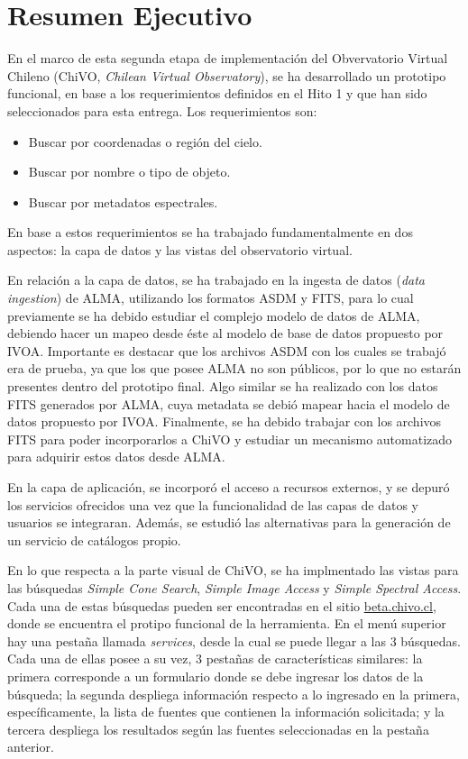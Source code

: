\section{Resumen Ejecutivo}

En el marco de esta segunda etapa de implementación del Obvervatorio
Virtual Chileno (ChiVO, \emph{Chilean Virtual Observatory}), se ha
desarrollado un prototipo funcional, en base a los requerimientos
definidos en el Hito 1 y que han sido seleccionados para esta entrega.
Los requerimientos son:

\begin{itemize}
  \item Buscar por coordenadas o región del cielo.
  \item Buscar por nombre o tipo de objeto.
  \item Buscar por metadatos espectrales.
\end{itemize}

En base a estos requerimientos se ha trabajado fundamentalmente en dos
aspectos: la capa de datos y las vistas del observatorio virtual.

En relación a la capa de datos, se ha trabajado en la ingesta de datos
(\emph{data ingestion}) de ALMA, utilizando los formatos ASDM y FITS,
para lo cual previamente se ha debido estudiar el complejo modelo de
datos de ALMA, debiendo hacer un mapeo desde éste al modelo de base de
datos propuesto por IVOA. Importante es destacar que los archivos ASDM
con los cuales se trabajó era de prueba, ya que los que posee ALMA no
son públicos, por lo que no estarán presentes dentro del prototipo
final. Algo similar se ha realizado con los datos FITS generados por
ALMA, cuya metadata se debió mapear hacia el modelo de datos propuesto
por IVOA. Finalmente, se ha debido trabajar con los archivos FITS para
poder incorporarlos a ChiVO y estudiar un mecanismo automatizado para
adquirir estos datos desde ALMA.

En la capa de aplicación, se incorporó el acceso a recursos
externos, y se depuró los servicios ofrecidos una vez 
que la funcionalidad de las capas de datos y usuarios 
se integraran. Además, se estudió las alternativas 
para la generación de un servicio de catálogos propio.

En lo que respecta a la parte visual de ChiVO, se ha implmentado las
vistas para las búsquedas \emph{Simple Cone Search}, \emph{Simple
  Image Access} y \emph{Simple Spectral Access}. Cada una de estas
búsquedas pueden ser encontradas en el sitio \url{beta.chivo.cl},
donde se encuentra el protipo funcional de la herramienta. En el menú
superior hay una pestaña llamada \emph{services}, desde la cual se
puede llegar a las 3 búsquedas. Cada una de ellas posee a su vez, 3
pestañas de características similares: la primera corresponde a un
formulario donde se debe ingresar los datos de la búsqueda; la segunda
despliega información respecto a lo ingresado en la primera,
específicamente, la lista de fuentes que contienen la información
solicitada; y la tercera despliega los resultados según las fuentes
seleccionadas en la pestaña anterior.
